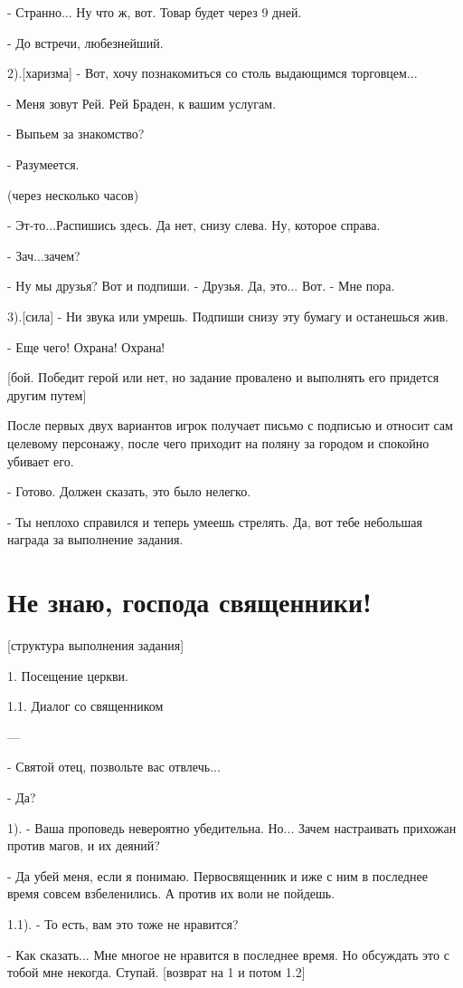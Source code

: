 \documentclass[12pt,a4paper]{book}
\begin{document}
- Странно... Ну что ж, вот. Товар будет через 9 дней.

- До встречи, любезнейший.

2).[харизма] - Вот, хочу познакомиться со столь выдающимся торговцем...

- Меня зовут Рей. Рей Браден, к вашим услугам.

- Выпьем за знакомство?

- Разумеется.

(через несколько часов)

- Эт-то...Распишись здесь. Да нет, снизу слева. Ну, которое справа.

- Зач...зачем?

- Ну мы друзья? Вот и подпиши.
- Друзья. Да, это... Вот.
- Мне пора. 

3).[сила] - Ни звука или умрешь. Подпиши снизу эту бумагу и останешься жив.

- Еще чего! Охрана! Охрана!

[бой. Победит герой или нет, но задание провалено и выполнять его придется другим путем]

После первых двух вариантов игрок получает письмо с подписью и относит сам целевому персонажу, после чего приходит на поляну за городом и спокойно убивает его.

- Готово. Должен сказать, это было нелегко.

- Ты неплохо справился и теперь умеешь стрелять. Да, вот тебе небольшая награда за выполнение задания.

\section{Не знаю, господа священники!}

[структура выполнения задания]

1. Посещение церкви.

1.1. Диалог со священником

---

- Святой отец, позвольте вас отвлечь...

- Да?

1). - Ваша проповедь невероятно убедительна. Но... Зачем настраивать прихожан против магов, и их деяний?

- Да убей меня, если я понимаю. Первосвященник и иже с ним в последнее время совсем взбеленились. А против их воли не пойдешь.

1.1). - То есть, вам это тоже не нравится?

- Как сказать... Мне многое не нравится в последнее время. Но обсуждать это с тобой мне некогда. Ступай. [возврат на 1 и потом 1.2]
\end{document}
